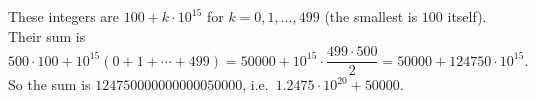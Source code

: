 These integers are $100+k\cdot10^{15}$ for $k=0,1,\dots,499$ (the smallest is $100$ itself). Their sum is
\[
500\cdot100+10^{15}(0+1+\cdots+499)=50000+10^{15}\cdot\dfrac{499\cdot500}{2}=50000+124750\cdot10^{15}.
\]
So the sum is $\boxed{124750000000000050000}$, i.e.\ $1.2475\cdot10^{20}+50000$.
